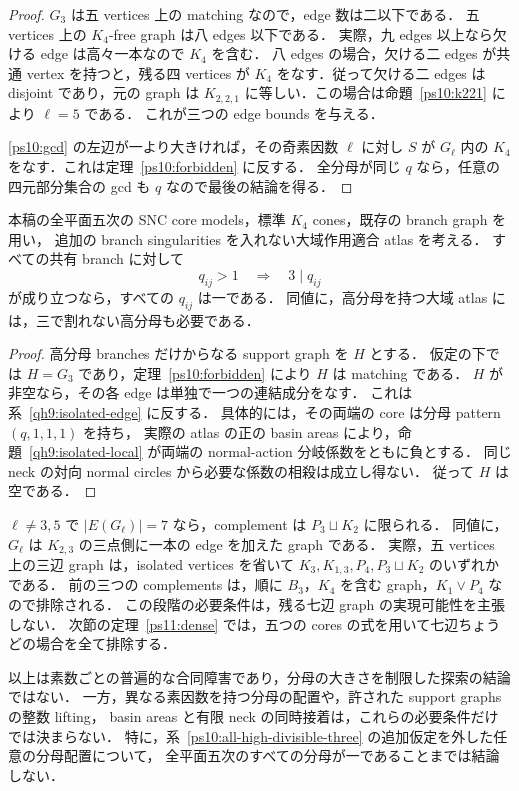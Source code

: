 \begin{proof}
$G_3$ は五 vertices 上の matching なので，edge 数は二以下である．
五 vertices 上の $K_4$-free graph は八 edges 以下である．
実際，九 edges 以上なら欠ける edge は高々一本なので $K_4$ を含む．
八 edges の場合，欠ける二 edges が共通 vertex を持つと，残る四 vertices が
$K_4$ をなす．従って欠ける二 edges は disjoint であり，元の graph は
$K_{2,2,1}$ に等しい．この場合は命題~\ref{ps10:k221} により $\ell=5$ である．
これが三つの edge bounds を与える．

\eqref{ps10:gcd} の左辺が一より大きければ，その奇素因数 $\ell$ に対し
$S$ が $G_\ell$ 内の $K_4$ をなす．これは定理~\ref{ps10:forbidden} に反する．
全分母が同じ $q$ なら，任意の四元部分集合の gcd も $q$ なので最後の結論を得る．
\end{proof}

\begin{corollary}[全高分母が三で割れる場合]\label{ps10:all-high-divisible-three}
本稿の全平面五次の SNC core models，標準 $K_4$ cones，既存の branch graph を用い，
追加の branch singularities を入れない大域作用適合 atlas を考える．
すべての共有 branch に対して
\[
 q_{ij}>1\quad\Longrightarrow\quad 3\mid q_{ij}
\]
が成り立つなら，すべての $q_{ij}$ は一である．
同値に，高分母を持つ大域 atlas には，三で割れない高分母も必要である．
\end{corollary}

\begin{proof}
高分母 branches だけからなる support graph を $H$ とする．
仮定の下では $H=G_3$ であり，定理~\ref{ps10:forbidden} により $H$ は matching である．
$H$ が非空なら，その各 edge は単独で一つの連結成分をなす．
これは系~\ref{qh9:isolated-edge} に反する．
具体的には，その両端の core は分母 pattern $(q,1,1,1)$ を持ち，
実際の atlas の正の basin areas により，命題~\ref{qh9:isolated-local} が両端の
normal-action 分岐係数をともに負とする．
同じ neck の対向 normal circles から必要な係数の相殺は成立し得ない．
従って $H$ は空である．
\end{proof}

\begin{remark}\label{ps10:seven-edge-shape}
$\ell\ne3,5$ で $|E(G_\ell)|=7$ なら，complement は $P_3\sqcup K_2$ に限られる．
同値に，$G_\ell$ は $K_{2,3}$ の三点側に一本の edge を加えた graph である．
実際，五 vertices 上の三辺 graph は，isolated vertices を省いて
$K_3,K_{1,3},P_4,P_3\sqcup K_2$ のいずれかである．
前の三つの complements は，順に $B_3$，$K_4$ を含む graph，$K_1\vee P_4$ なので排除される．
この段階の必要条件は，残る七辺 graph の実現可能性を主張しない．
次節の定理~\ref{ps11:dense} では，五つの cores の式を用いて七辺ちょうどの場合を全て排除する．
\end{remark}

以上は素数ごとの普遍的な合同障害であり，分母の大きさを制限した探索の結論ではない．
一方，異なる素因数を持つ分母の配置や，許された support graphs の整数 lifting，
basin areas と有限 neck の同時接着は，これらの必要条件だけでは決まらない．
特に，系~\ref{ps10:all-high-divisible-three} の追加仮定を外した任意の分母配置について，
全平面五次のすべての分母が一であることまでは結論しない．
